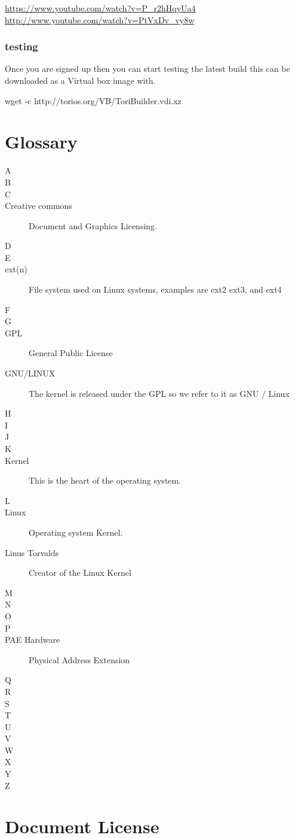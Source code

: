 \documentclass[12pt,a4paper]{book}
\begin{document}
\url{https://www.youtube.com/watch?v=P_r2hHqyUa4}
\url{http://www.youtube.com/watch?v=PtVxDv_vy8w}


\subsection {testing}
Once you are signed up then you can start testing the latest build this can be downloaded as a Virtual box image with.

wget -c http://torios.org/VB/ToriBuilder.vdi.xz \\


\chapter{Glossary}
\begin{multicols}{2}


\begin{description}
\item[A]
\item[B]
\item[C]
\item[Creative commons] Document and Graphics Licensing.
\item[D]
\item[E]
\item[ext(n)] File system used on Linux systems, examples are ext2 ext3, and ext4 
\item[F]
\item[G]
\item[GPL] General Public License 
\item[GNU/LINUX] The kernel is released under the GPL so we refer to it as GNU / Linux
\item[H]
\item[I]
\item[J]
\item[K]
\item[Kernel] This is the heart of the operating system.
\columnbreak
\item[L]
\item[Linux] Operating system Kernel. 
\item[Linus Torvalds] Creator of the Linux Kernel
\item[M]
\item[N]
\item[O]
\item[P]
\item[PAE Hardware] Physical Address Extension 
\item[Q]
\item[R]
\item[S]
\item[T]
\item[U]
\item[V]
\item[W]
\item[X]
\item[Y]
\item[Z]
\end{description}
\end{multicols}
\chapter{Document License}

\end{document}
